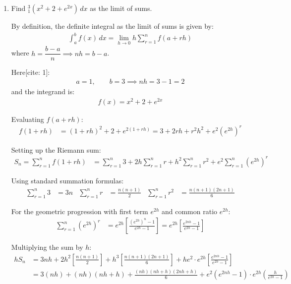\begin{enumerate}[label=\thesubsection.\arabic*, ref=\thesubsection.\theenumi]
Since $\dfrac{d^2Z}{dy^2} > 0$, $Z$ attains a local and global minimum at $y = -4$.

Substituting $y = -4$ into the relation $x = \dfrac{y^2}{4}$:
\begin{align*}
	x = \frac{(-4)^2}{4} = \frac{16}{4} = 4
\end{align*}

Therefore, the point on the curve nearest to $(2, -8)$ is $(4, -4)$.

\item Find $_1^3 (x^2+2+e^{2x})\,dx$ as the limit of sums.

\solution
By definition, the definite integral as the limit of sums is given by:
\begin{align*}
	\int_a^b f(x)\,dx = \lim_{h \to 0} h \sum_{r=1}^n f(a + rh)
\end{align*}
where $h = \dfrac{b - a}{n} \implies nh = b - a$.

Here[cite: 1]:
\begin{align*}
	a = 1, \qquad b = 3 \implies nh = 3 - 1 = 2
\end{align*}
and the integrand is:
\begin{align*}
	f(x) = x^2 + 2 + e^{2x}
\end{align*}

Evaluating $f(a + rh)$:
\begin{align*}
	f(1 + rh) &= (1 + rh)^2 + 2 + e^{2(1 + rh)} 
	= 3 + 2rh + r^2h^2 + e^2(e^{2h})^r
\end{align*}

Setting up the Riemann sum:
\begin{align*}
	S_n = \sum_{r=1}^n f(1 + rh) &= \sum_{r=1}^n 3 + 2h\sum_{r=1}^n r + h^2\sum_{r=1}^n r^2 + e^2\sum_{r=1}^n (e^{2h})^r
\end{align*}

Using standard summation formulas:
\begin{align*}
	\sum_{r=1}^n 3 &= 3n &
	\sum_{r=1}^n r &= \frac{n(n + 1)}{2} &
	\sum_{r=1}^n r^2 &= \frac{n(n + 1)(2n + 1)}{6}
\end{align*}

For the geometric progression with first term $e^{2h}$ and common ratio $e^{2h}$:
\begin{align*}
	\sum_{r=1}^n (e^{2h})^r &= e^{2h} \left[\frac{(e^{2h})^n - 1}{e^{2h} - 1}\right] = e^{2h} \left[\frac{e^{2nh} - 1}{e^{2h} - 1}\right]
\end{align*}

Multiplying the sum by $h$:
\begin{align*}
	h S_n &= 3nh + 2h^2\left[\frac{n(n+1)}{2}\right] + h^3\left[\frac{n(n+1)(2n+1)}{6}\right] + h e^2 \cdot e^{2h}\left[\frac{e^{2nh} - 1}{e^{2h} - 1}\right] \\
	&= 3(nh) + (nh)(nh + h) + \frac{(nh)(nh + h)(2nh + h)}{6} + e^2(e^{2nh} - 1) \cdot e^{2h} \left(\frac{h}{e^{2h} - 1}\right)
\end{align*}


\end{enumerate}
